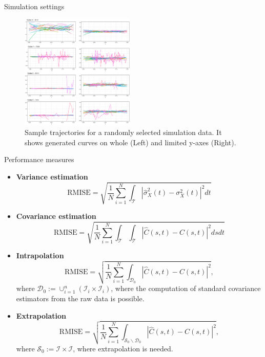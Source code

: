\documentclass[9pt]{beamer}
\begin{document}
\begin{frame}[allowframebreaks]{Simulation settings}
    \pagebreak
	\vspace*{0pt}
	\begin{figure}[h]
		\centering
		\includegraphics[height=5.5cm,keepaspectratio=true]{img/samp_traj.eps}
		\caption{Sample trajectories for a randomly selected simulation data. It shows generated curves on whole (Left) and limited y-axes (Right).}
		\label{fig4}
	\end{figure}
\end{frame}

\begin{frame}[allowframebreaks]{Performance measures}
	\begin{itemize}
		\item{
			\textbf{Variance estimation}
			$$
			\text{RMISE} = \sqrt{ \frac{1}{N} \sum_{i=1}^N \int_{\mathcal{T}} |\hat{\sigma}^2_X(t) - \sigma^2_X(t)|^2 dt} 
			$$
		}
		\item{
			\textbf{Covariance estimation}
			$$
			\text{RMISE} = \sqrt{ \frac{1}{N} \sum_{i=1}^N \int_{\mathcal{T}}\int_{\mathcal{T}} |\hat{C}(s,t) - C(s,t)|^2 dsdt}
			$$
		}
		
		\pagebreak
		\item{
			\textbf{Intrapolation}
			$$
			\text{RMISE} = \sqrt{ \frac{1}{N} \sum_{i=1}^N \int_{\mathcal{D}_0} |\hat{C}(s,t) - C(s,t)|^2},
			$$
			where $\mathcal{D}_0 := \cup_{i=1}^n ( \mathcal{I}_i \times \mathcal{I}_i )$, where the computation of standard covariance estimators from the raw data is possible.
		}
		\item{
			\textbf{Extrapolation}
			$$
			\text{RMISE} = \sqrt{ \frac{1}{N} \sum_{i=1}^N \int_{\mathcal{S}_0 \backslash \mathcal{D}_0} |\hat{C}(s,t) - C(s,t)|^2},
			$$
			where $\mathcal{S}_0 :=  \mathcal{I} \times \mathcal{I}$, where extrapolation is needed.
		}
	\end{itemize}
	
\end{frame}
\end{document}
